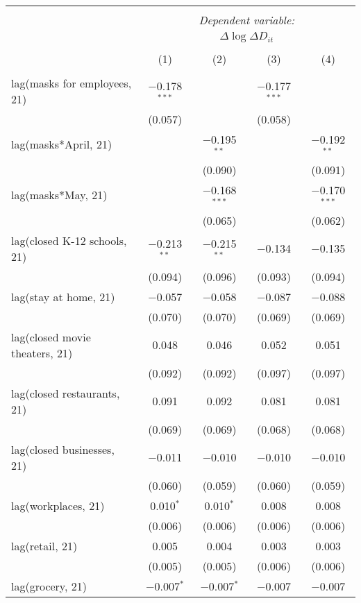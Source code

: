 \begin{tabular}{@{\extracolsep{1pt}}lcccc} 
\\[-1.8ex]\hline 
\hline \\[-1.8ex] 
 & \multicolumn{4}{c}{\textit{Dependent variable:}} \\ 
\cline{2-5} 
 & \multicolumn{4}{c}{$\Delta \log \Delta D_{it}$} \\ 
\\[-1.8ex] & (1) & (2) & (3) & (4)\\ 
\hline \\[-1.8ex] 
 lag(masks for employees, 21) & $-$0.178$^{***}$ &  & $-$0.177$^{***}$ &  \\ 
  & (0.057) &  & (0.058) &  \\ 
  lag(masks*April, 21) &  & $-$0.195$^{**}$ &  & $-$0.192$^{**}$ \\ 
  &  & (0.090) &  & (0.091) \\ 
  lag(masks*May, 21) &  & $-$0.168$^{***}$ &  & $-$0.170$^{***}$ \\ 
  &  & (0.065) &  & (0.062) \\ 
  lag(closed K-12 schools, 21) & $-$0.213$^{**}$ & $-$0.215$^{**}$ & $-$0.134 & $-$0.135 \\ 
  & (0.094) & (0.096) & (0.093) & (0.094) \\ 
  lag(stay at home, 21) & $-$0.057 & $-$0.058 & $-$0.087 & $-$0.088 \\ 
  & (0.070) & (0.070) & (0.069) & (0.069) \\ 
  lag(closed movie theaters, 21) & 0.048 & 0.046 & 0.052 & 0.051 \\ 
  & (0.092) & (0.092) & (0.097) & (0.097) \\ 
  lag(closed restaurants, 21) & 0.091 & 0.092 & 0.081 & 0.081 \\ 
  & (0.069) & (0.069) & (0.068) & (0.068) \\ 
  lag(closed businesses, 21) & $-$0.011 & $-$0.010 & $-$0.010 & $-$0.010 \\ 
  & (0.060) & (0.059) & (0.060) & (0.059) \\ 
  lag(workplaces, 21) & 0.010$^{*}$ & 0.010$^{*}$ & 0.008 & 0.008 \\ 
  & (0.006) & (0.006) & (0.006) & (0.006) \\ 
  lag(retail, 21) & 0.005 & 0.004 & 0.003 & 0.003 \\ 
  & (0.005) & (0.005) & (0.006) & (0.006) \\ 
  lag(grocery, 21) & $-$0.007$^{*}$ & $-$0.007$^{*}$ & $-$0.007 & $-$0.007 \\ 

\end{tabular}
